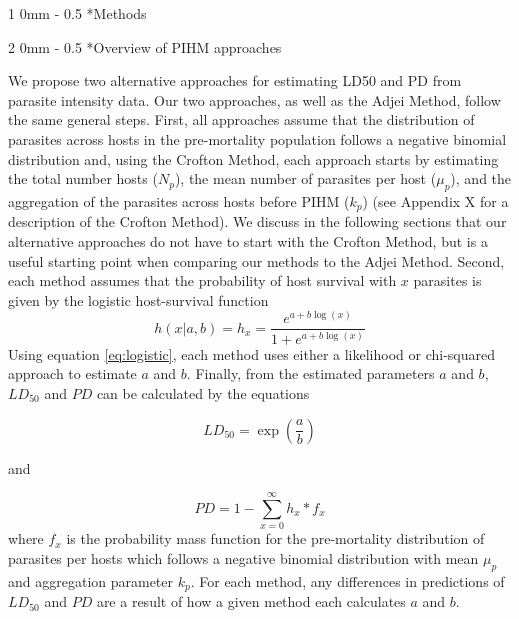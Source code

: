 \documentclass[12pt, a4paper]{article}
\makeatletter
\renewcommand{\section}{\@startsection
{section}%
{1}%
{0mm}%
{-\baselineskip}%
{0.5\baselineskip}%
{\normalfont\bf\large}} %
\renewcommand{\subsection}{\@startsection
{subsection}%
{2}%
{0mm}%
{-\baselineskip}%
{0.5\baselineskip}%
{\normalfont\bf}} %
\makeatother
\begin{document}
\doublespacing
\linenumbers

\section*{Methods}


\subsection*{Overview of PIHM approaches}

We propose two alternative approaches for estimating LD50 and PD from
parasite intensity data.  Our two approaches, as well as the Adjei Method,
follow the same general steps.  First, all approaches assume that the
distribution of parasites across hosts in the pre-mortality population follows
a negative binomial distribution and, using the Crofton Method, each approach
starts by estimating the total number hosts ($N_p$), the mean number of
parasites per host ($\mu_p$), and the aggregation of the parasites across hosts
before PIHM ($k_p$) (see Appendix X for a description of the Crofton Method). We discuss in the following sections that our alternative approaches do not have to start with the Crofton Method, but is a useful starting point when comparing our methods to the Adjei Method.
Second, each method assumes that the probability of host survival with $x$ parasites is given by the logistic host-survival function
\begin{equation}
    h(x | a, b) = h_x = \dfrac{e^{a + b \log(x)}}{1 + e^{a + b \log(x)}}
    \label{eq:logistic}
\end{equation}
Using equation \ref{eq:logistic}, each method uses either a likelihood or chi-squared approach to estimate $a$ and $b$.  Finally, from the estimated parameters $a$ and $b$,
$LD_{50}$ and $PD$ can be calculated by the equations \citep{Adjei1986}

\begin{equation}
    LD_{50} = \exp(\frac{a}{b})
    \label{eq:ld50}
\end{equation}

and

\begin{equation}
    PD = 1 -  \sum_{x=0}^\infty h_x * f_x
    \label{eq:pd}
\end{equation}
where $f_x$ is the probability mass function for the pre-mortality distribution of parasites per hosts which follows a negative binomial distribution with mean $\mu_p$ and aggregation parameter $k_p$. For
each method, any differences in predictions of
$LD_{50}$ and $PD$ are a result of how a given method each calculates $a$ and $b$.
\end{document}
